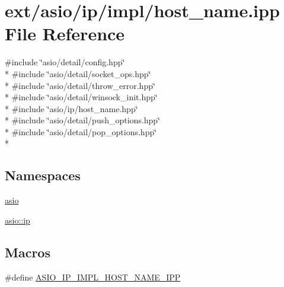 \hypertarget{host__name_8ipp}{}\section{ext/asio/ip/impl/host\+\_\+name.ipp File Reference}
\label{host__name_8ipp}
{\ttfamily \#include \char`\"{}asio/detail/config.\+hpp\char`\"{}}\\*
{\ttfamily \#include \char`\"{}asio/detail/socket\+\_\+ops.\+hpp\char`\"{}}\\*
{\ttfamily \#include \char`\"{}asio/detail/throw\+\_\+error.\+hpp\char`\"{}}\\*
{\ttfamily \#include \char`\"{}asio/detail/winsock\+\_\+init.\+hpp\char`\"{}}\\*
{\ttfamily \#include \char`\"{}asio/ip/host\+\_\+name.\+hpp\char`\"{}}\\*
{\ttfamily \#include \char`\"{}asio/detail/push\+\_\+options.\+hpp\char`\"{}}\\*
{\ttfamily \#include \char`\"{}asio/detail/pop\+\_\+options.\+hpp\char`\"{}}\\*
\subsection*{Namespaces}
\begin{DoxyCompactItemize}
\item 
 \hyperlink{namespaceasio}{asio}
\item 
 \hyperlink{namespaceasio_1_1ip}{asio\+::ip}
\end{DoxyCompactItemize}
\subsection*{Macros}
\begin{DoxyCompactItemize}
\item 
\#define \hyperlink{host__name_8ipp_aa0b30e8af8b179a48a97e8ae9b1f02a3}{A\+S\+I\+O\+\_\+\+I\+P\+\_\+\+I\+M\+P\+L\+\_\+\+H\+O\+S\+T\+\_\+\+N\+A\+M\+E\+\_\+\+I\+P\+P}
\end{DoxyCompactItemize}
